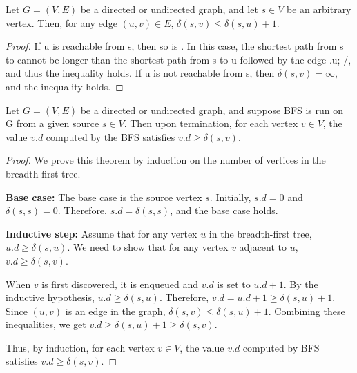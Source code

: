 \newtheorem{shortest path}{Lemma}
\begin{theorem}
    Let $G = (V, E)$ be a directed or undirected graph, and let $s \in V$ be an arbitrary
    vertex. Then, for any edge $(u, v) \in E$, $\delta(s, v) \leq \delta(s, u) + 1$.
\end{theorem}

\begin{proof}
    If u is reachable from s, then so is . In this case, the shortest path from s
    to cannot be longer than the shortest path from s to u followed by the edge .u; /,
    and thus the inequality holds. If u is not reachable from s, then $\delta(s,v) = \infty$, and
    the inequality holds.
\end{proof}
\newpage
\newtheorem{shortest path 2}{Lemma}
\begin{theorem}
    Let $G = (V, E)$ be a directed or undirected graph, and suppose BFS is run on G
    from a given source $s \in V$. Then upon termination, for each vertex $v \in V$, 
    the value $v.d$ computed by the BFS satisfies $v.d \geq \delta(s, v)$.
\end{theorem}
\begin{proof}
    We prove this theorem by induction on the number of vertices in the breadth-first tree.

    \textbf{Base case:} The base case is the source vertex $s$. Initially, $s.d = 0$ and $\delta(s, s) = 0$. Therefore, $s.d = \delta(s, s)$, and the base case holds.

    \textbf{Inductive step:} Assume that for any vertex $u$ in the breadth-first tree, $u.d \geq \delta(s, u)$. We need to show that for any vertex $v$ adjacent to $u$, $v.d \geq \delta(s, v)$.

    When $v$ is first discovered, it is enqueued and $v.d$ is set to $u.d + 1$. By the inductive hypothesis, $u.d \geq \delta(s, u)$. Therefore, $v.d = u.d + 1 \geq \delta(s, u) + 1$. Since $(u, v)$ is an edge in the graph, $\delta(s, v) \leq \delta(s, u) + 1$. Combining these inequalities, we get $v.d \geq \delta(s, u) + 1 \geq \delta(s, v)$.

    Thus, by induction, for each vertex $v \in V$, the value $v.d$ computed by BFS satisfies $v.d \geq \delta(s, v)$.
\end{proof}

